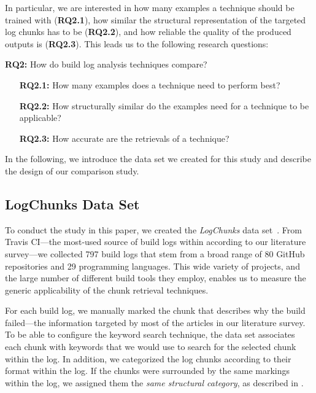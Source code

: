 In particular, we are interested in how many examples a technique
should be trained with (\textbf{RQ2.1}),
how similar the structural representation of the targeted log chunks
has to be (\textbf{RQ2.2}), and how reliable the quality of the
produced outputs is (\textbf{RQ2.3}).
This leads us to the following research questions:

\begin{simplebox}[minipage boxed title*=-1.5cm,
attach boxed title to top center={yshift=-6mm}]
{\textbf{RQ2:} How do build log analysis techniques compare?}
\begin{itemize}[leftmargin=1.2cm]
  \item[\textbf{RQ2.1:}] How many examples does a technique need to
  perform best?
  \item[\textbf{RQ2.2:}] How structurally similar do the examples
  need for a technique to be applicable?
  \item[\textbf{RQ2.3:}] How accurate are the retrievals of a technique?
\end{itemize}
\end{simplebox}

In the following, we introduce the data set we created for this
study and describe the design of our comparison study.

\subsection{LogChunks Data Set}
\label{sec:logchunks}
To conduct the study in this paper, we created the
\emph{LogChunks} data set~\cite{brandt2020logchunks}.
From Travis CI---the most-used source of build logs within
according to our literature survey---we collected
797 build logs that
stem from a broad range of 80 GitHub repositories and 29
programming languages.
This wide variety of projects, and the large number of different build
tools they employ, enables us to measure the generic
applicability of the chunk retrieval techniques.

For each build log, we manually marked
the chunk that describes why the build
failed---the information targeted by most of the articles in our
literature survey.
To be able to configure the keyword search technique,
the data set associates each chunk with keywords that we
would use to search for the selected chunk within the log.
In
addition, we categorized the log chunks according to their format
within the log.
If the chunks were surrounded by the same markings
within the log, we assigned them the \emph{same structural category},
as described in .

